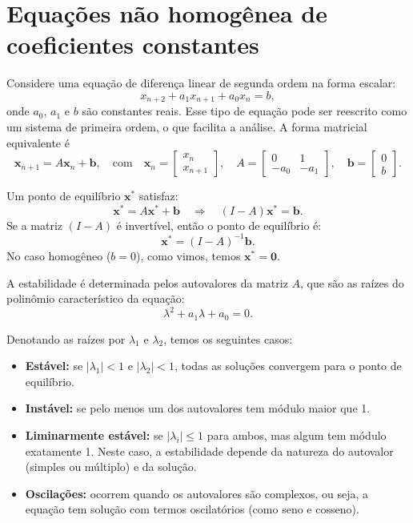\documentclass{article}
\begin{document}
\section{Equações não homogênea de coeficientes constantes}

Considere uma equação de diferença linear de segunda ordem na forma
escalar:
\begin{equation*}
x_{n+2} + a_1 x_{n+1} + a_0 x_n = b,
\end{equation*}
onde $a_0$, $a_1$ e $b$ são constantes reais. Esse tipo de equação pode
ser reescrito como um sistema de primeira ordem, o que facilita a
análise. A forma matricial equivalente é  
\begin{equation*}
  \bm{x}_{n+1} = A \bm{x}_n + \bm{b},
  \quad \text{com} \quad
  \bm{x}_n = \begin{bmatrix} x_n \\ x_{n+1} \end{bmatrix}, 
  \quad 
  A = \begin{bmatrix}
    0 & 1 \\
    - a_0 & - a_1
  \end{bmatrix}, \quad
  \bm{b} = \begin{bmatrix}
    0 \\
    b
  \end{bmatrix}.
\end{equation*}

Um ponto de equilíbrio $\bm{x}^*$ satisfaz:
\[
\bm{x}^* = A \bm{x}^* + \bm{b} \quad \Rightarrow \quad (I - A)\bm{x}^* = \bm{b}.
\]
Se a matriz $(I - A)$ é invertível, então o ponto de equilíbrio é:
\[
\bm{x}^* = (I - A)^{-1} \bm{b}.
\]
No caso homogêneo ($b = 0$), como vimos, temos $\bm{x}^* = \bm{0}$.

A estabilidade é determinada pelos autovalores da matriz $A$, que são
as raízes do polinômio característico da equação:
\[
\lambda^2 + a_1 \lambda + a_0 = 0.
\]

Denotando as raízes por $\lambda_1$ e $\lambda_2$, temos os seguintes casos:

\begin{itemize}
    \item \textbf{Estável:} se $|\lambda_1| < 1$ e $|\lambda_2| < 1$, todas as soluções convergem para o ponto de equilíbrio.
    
    \item \textbf{Instável:} se pelo menos um dos autovalores tem módulo maior que 1.
    
    \item \textbf{Liminarmente estável:} se $|\lambda_i| \leq 1$ para
      ambos, mas algum tem módulo exatamente 1. Neste caso, a
      estabilidade depende da natureza do autovalor (simples ou
      múltiplo) e da solução.
    
    \item \textbf{Oscilações:} ocorrem quando os autovalores são
      complexos, ou seja, a equação tem solução com termos oscilatórios
      (como seno e cosseno).
\end{itemize}
\end{document}

